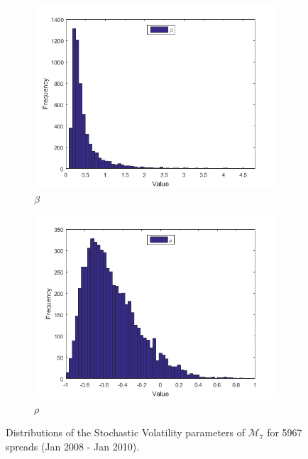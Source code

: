 \documentclass[11pt,a4,twosided,singlespacing,titlepagenumber=on]{scrreprt}
\numberwithin{equation}{chapter} %
\theoremstyle{remark}
\begin{document}
\begin{figure}[H]
\begin{subfigure}[t]{0.32\textwidth}
        \includegraphics[width=1\textwidth]{res/params/6575_7306/5}
        \caption{$\beta$}
    \end{subfigure}
    \begin{subfigure}[t]{0.32\textwidth}
        \centering
        \includegraphics[width=1\textwidth]{res/params/6575_7306/6}
        \caption{$\rho$}
    \end{subfigure}
    \caption[]{Distributions of the Stochastic Volatility parameters of $\mathcal{M}_7$ for 5967 spreads (Jan 2008 - Jan 2010).}
    \label{fig:param_dists_2000_2002}
\end{figure}
\end{document}
